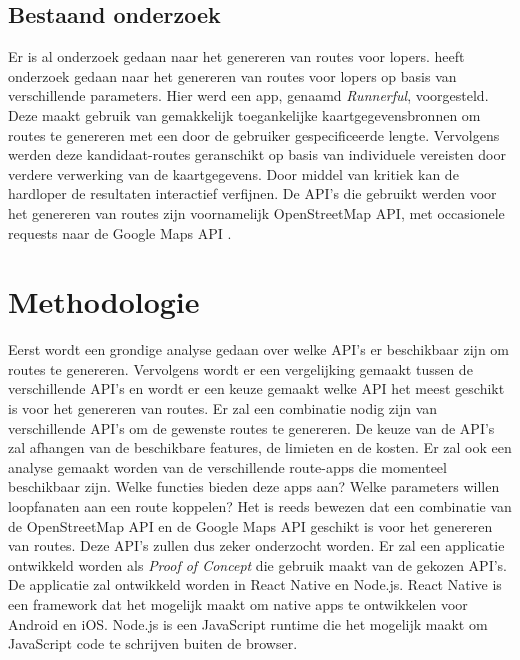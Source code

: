 \subsection{Bestaand onderzoek}
Er is al onderzoek gedaan naar het genereren van routes voor lopers. \textcite{Loepp2018} heeft onderzoek gedaan naar het genereren van routes voor lopers op basis van verschillende parameters.
Hier werd een app, genaamd \textit{Runnerful}, voorgesteld. Deze maakt gebruik van gemakkelijk toegankelijke kaartgegevensbronnen om routes te genereren met een door de gebruiker gespecificeerde lengte.
Vervolgens werden  deze kandidaat-routes geranschikt op basis van individuele vereisten door verdere verwerking van de kaartgegevens. Door middel van kritiek kan de hardloper de resultaten interactief verfijnen.
De API's die gebruikt werden voor het genereren van routes zijn voornamelijk OpenStreetMap API, met occasionele requests naar de Google Maps API \autocite{Loepp2018}.


\section{Methodologie}%
\label{sec:methodologie}

Eerst wordt een grondige analyse gedaan over welke API's er beschikbaar zijn om routes te genereren. Vervolgens wordt er een vergelijking gemaakt tussen de verschillende API's en wordt er een keuze gemaakt welke API het meest geschikt is voor het genereren van routes. Er zal een combinatie nodig zijn van verschillende API's om de gewenste routes te genereren.
De keuze van de API's zal afhangen van de beschikbare features, de limieten en de kosten. Er zal ook een analyse gemaakt worden van de verschillende route-apps die momenteel beschikbaar zijn. Welke functies bieden deze apps aan? Welke parameters willen loopfanaten aan een route koppelen? 
Het is reeds bewezen dat een combinatie van de OpenStreetMap API en de Google Maps API geschikt is voor het genereren van routes. \autocite{Loepp2018} Deze API's zullen dus zeker onderzocht worden.
Er zal een applicatie ontwikkeld worden als \emph{Proof of Concept} die gebruik maakt van de gekozen API's. De applicatie zal ontwikkeld worden in React Native en Node.js. React Native is een framework dat het mogelijk maakt om native apps te ontwikkelen voor Android en iOS\@. Node.js is een JavaScript runtime die het mogelijk maakt om JavaScript code te schrijven buiten de browser.


